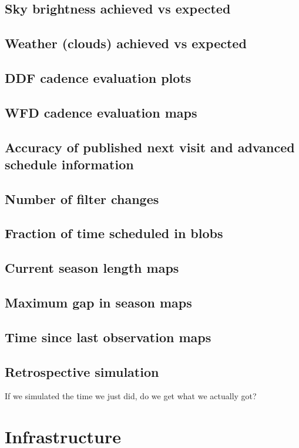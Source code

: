 \subsection{Sky brightness achieved vs expected}
\label{sec:org1bc45fb}
\subsection{Weather (clouds) achieved vs expected}
\label{sec:orgf2f2124}
\subsection{DDF cadence evaluation plots}
\label{sec:org53f0866}
\subsection{WFD cadence evaluation maps}
\label{sec:org2c5efc8}
\subsection{Accuracy of published next visit and advanced schedule information}
\label{sec:orga4e2b9f}
\subsection{Number of filter changes}
\label{sec:org4507f90}
\subsection{Fraction of time scheduled in blobs}
\label{sec:orgd0aa533}
\subsection{Current season length maps}
\label{sec:org6a5eb51}
\subsection{Maximum gap in season maps}
\label{sec:orgec320cb}
\subsection{Time since last observation maps}
\label{sec:org83f80bb}
\subsection{Retrospective simulation}
\label{sec:orgf491c31}
If we simulated the time we just did, do we get what we actually got?
\section{Infrastructure}
\label{sec:org6cbd899}

